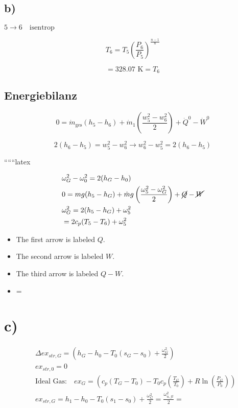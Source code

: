 \subsection*{b)}

$5 \rightarrow 6 \quad \text{isentrop}$

\[
T_6 = T_5 \left( \frac{P_6}{P_5} \right)^{\frac{n-1}{n}}
\]

\[
= 328.07 \text{ K} = T_6
\]

\subsection*{Energiebilanz}

\[
0 = \dot{m}_{\text{ges}} (h_5 - h_6) + \dot{m}_1 \left( \frac{w_5^2 - w_6^2}{2} \right) + \dot{Q}^0 - \dot{W}^0
\]

\[
2 (h_6 - h_5) = w_5^2 - w_6^2 \rightarrow w_6^2 - w_5^2 = 2 (h_6 - h_5)
\]

``````latex

\begin{align*}
&\omega_G^2 - \omega_0^2 = 2(h_G - h_0) \\
&0 = mg(h_5 - h_G) + \dot{m}g \left( \frac{\omega_5^2 - \omega_G^2}{2} \right) + \cancel{Q} - \cancel{W} \\
&\omega_G^2 = 2(h_5 - h_G) + \omega_5^2 \\
&= 2c_p(T_5 - T_6) + \omega_5^2
\end{align*}

\begin{itemize}
    \item The first arrow is labeled $Q$.
    \item The second arrow is labeled $W$.
    \item The third arrow is labeled $Q - W$.
\end{itemize}

\begin{itemize}
    \item {} \quad {} = 
\end{itemize}

\section*{c)}
\begin{align*}
&\Delta ex_{str,G} = (h_G - h_0 - T_0(s_G - s_0) + \frac{\omega_G^2}{2}) \\
&ex_{str,0} = 0 \\
&\text{Ideal Gas:} \quad ex_G = (c_p(T_G - T_0) - T_0 c_p \left( \frac{T_G}{T_0} \right) + R \ln \left( \frac{P_G}{P_0} \right)) \\
&ex_{str,G} = h_1 - h_0 - T_0(s_1 - s_0) + \frac{\omega_G^2}{2} = \frac{\omega_{u,ft}^2}{2} = 
\end{align*}

